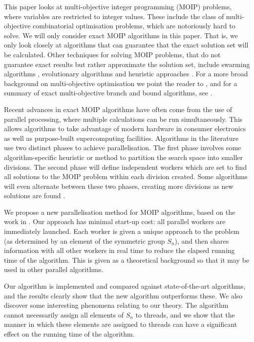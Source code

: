 \documentclass{amsart}
\theoremstyle{definition}
\begin{document}
This paper looks at multi-objective integer programming (MOIP) problems, where variables are restricted to integer values.
These include the class of multi-objective combinatorial optimisation problems, which are notoriously hard to solve.
We will only consider exact MOIP algorithms in this paper. That is, we only look closely at algorithms that can guarantee that the exact solution set will be calculated.
Other techniques for solving MOIP problems, that do not guarantee exact results but rather approximate the solution set, include swarming algorithms \cite{Parsopoulos2002ParticleSwarm}, evolutionary algorithms \cite{EvolutionaryAlgorithmsForMOP,Figueira2010ParallelEvolutionary} and heuristic approaches \cite{Laumanns2006EfficientAdaptive}.
For a more broad background on multi-objective optimisation we point the reader to \cite{ehrgott2005multicriteria},
and for a summary of exact multi-objective branch and bound algorithms, see \cite{Przybylski2017}.

Recent advances in exact MOIP algorithms have often come from the use of parallel processing, where multiple calculations can be run simultaneously\cite{Lemesre2007PPM,Dhaenens2010KPPM}.
This allows algorithms to take advantage of modern hardware in consumer electronics as well as purpose-built supercomputing facilities.
Algorithms in the literature use two distinct phases to achieve parallelisation.
The first phase involves some algorithm-specific heuristic or method to partition the search space into smaller divisions.
The second phase will define independent workers which are set to find all solutions to the MOIP  problem within each division created.
Some algorithms will even alternate between these two phases, creating more divisions as new solutions are found \cite{Guo:2014:ScalingExactMOCO,Mezmaz2007GridBased}.

We propose a new parallelisation method for MOIP algorithms, based on the work in \cite{OzlenPettersson2016BiObjective}.
Our approach has minimal start-up cost: all parallel workers are immediately launched.
Each worker is given a unique approach to the problem (as determined by an element of the symmetric group $S_n$), and then shares information with all other workers in real time to reduce the elapsed running time of the algorithm.
This is given as a theoretical background so that it may be used in other parallel algorithms.

Our algorithm is implemented and compared against state-of-the-art algorithms, and the
results clearly show that the new algorithm outperforms these.
We also discover some interesting phenomena relating to our theory.
The algorithm cannot necessarily assign all elements of $S_n$ to threads, and we show that the manner in which these elements are assigned to threads can have a significant effect on the running time of the algorithm.
\end{document}
